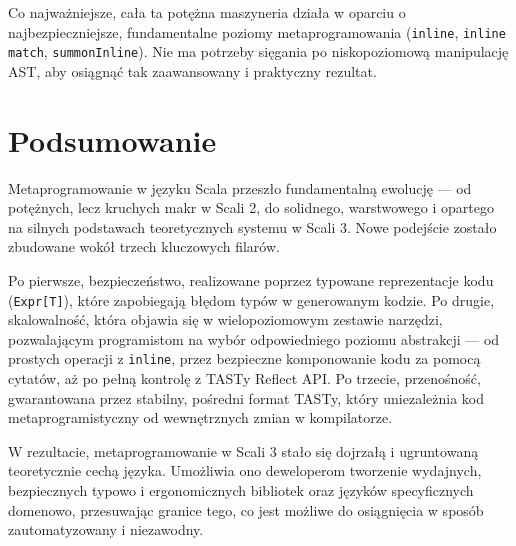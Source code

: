 Co najważniejsze, cała ta potężna maszyneria działa w oparciu o najbezpieczniejsze, fundamentalne poziomy metaprogramowania (\verb|inline|, \verb|inline match|, \verb|summonInline|).
Nie ma potrzeby sięgania po niskopoziomową manipulację AST, aby osiągnąć tak zaawansowany i praktyczny rezultat.


\section{Podsumowanie}
Metaprogramowanie w języku Scala przeszło fundamentalną ewolucję — od potężnych, lecz kruchych makr w Scali 2, do solidnego, warstwowego i opartego na silnych podstawach teoretycznych systemu w Scali 3.
Nowe podejście zostało zbudowane wokół trzech kluczowych filarów.

Po pierwsze, bezpieczeństwo, realizowane poprzez typowane reprezentacje kodu (\verb|Expr[T]|), które zapobiegają błędom typów w generowanym kodzie.
Po drugie, skalowalność, która objawia się w wielopoziomowym zestawie narzędzi, pozwalającym programistom na wybór odpowiedniego poziomu abstrakcji — od prostych operacji z \verb|inline|, przez bezpieczne komponowanie kodu za pomocą cytatów, aż po pełną kontrolę z TASTy Reflect API.
Po trzecie, przenośność, gwarantowana przez stabilny, pośredni format TASTy, który uniezależnia kod metaprogramistyczny od wewnętrznych zmian w kompilatorze.

W rezultacie, metaprogramowanie w Scali 3 stało się dojrzałą i ugruntowaną teoretycznie cechą języka.
Umożliwia ono deweloperom tworzenie wydajnych, bezpiecznych typowo i ergonomicznych bibliotek oraz języków specyficznych domenowo, przesuwając granice tego, co jest możliwe do osiągnięcia w sposób zautomatyzowany i niezawodny.
